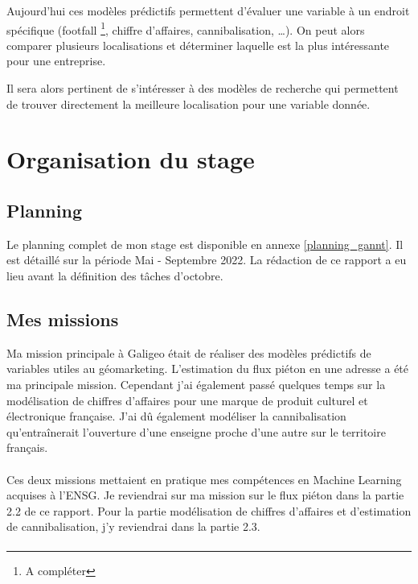 Aujourd’hui ces modèles prédictifs permettent d’évaluer une variable à un endroit spécifique (footfall \footnote{A compléter}, chiffre d’affaires, cannibalisation, …). On peut alors comparer plusieurs localisations et déterminer laquelle est la plus intéressante pour une entreprise.

Il sera alors pertinent de s’intéresser à des modèles de recherche qui permettent de trouver directement la meilleure localisation pour une variable donnée.


\section{Organisation du stage}

\subsection{Planning}

Le planning complet de mon stage est disponible en annexe \ref{planning_gannt}. Il est détaillé sur la période Mai - Septembre 2022. La rédaction de ce rapport a eu lieu avant la définition des tâches d'octobre.

\subsection{Mes missions}

Ma mission principale à Galigeo était de réaliser des modèles prédictifs de variables utiles au géomarketing. L’estimation du flux piéton en une adresse a été ma principale mission. Cependant j’ai également passé quelques temps sur la modélisation de chiffres d’affaires pour une marque de produit culturel et électronique française. J’ai dû également modéliser la cannibalisation qu’entraînerait l’ouverture d’une enseigne proche d’une autre sur le territoire français.

\paragraph*{}

Ces deux missions mettaient en pratique mes compétences en Machine Learning acquises à l’ENSG. Je reviendrai sur ma mission sur le flux piéton dans la partie 2.2 de ce rapport. Pour la partie modélisation de chiffres d’affaires et d’estimation de cannibalisation, j’y reviendrai dans la partie 2.3.

\paragraph*{}

